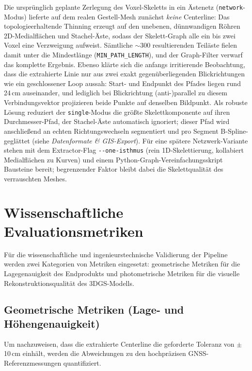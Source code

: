 \documentclass[12pt,a4paper]{article}
\begin{document}
\begin{enumerate}
          Die ursprünglich geplante Zerlegung des Voxel-Skeletts in ein Ästenetz (\texttt{network}-Modus) lieferte auf dem realen Gestell-Mesh zunächst \emph{keine} Centerline: Das topologieerhaltende Thinning erzeugt auf den unebenen, dünnwandigen Röhren 2D-Medialflächen und Stachel-Äste, sodass der Skelett-Graph alle ein bis zwei Voxel eine Verzweigung aufweist. Sämtliche $\sim$300 resultierenden Teiläste fielen damit unter die Mindestlänge (\texttt{MIN\_PATH\_LENGTH}), und der Graph-Filter verwarf das komplette Ergebnis. Ebenso klärte sich die anfangs irritierende Beobachtung, dass die extrahierte Linie nur aus zwei exakt gegenüberliegenden Blickrichtungen wie ein geschlossener Loop aussah: Start- und Endpunkt des Pfades liegen rund 24\,cm auseinander, und lediglich bei Blickrichtung (anti-)parallel zu diesem Verbindungsvektor projizieren beide Punkte auf denselben Bildpunkt. Als robuste Lösung reduziert der \texttt{single}-Modus die größte Skelettkomponente auf ihren Durchmesser-Pfad, der Stachel-Äste automatisch ignoriert; dieser Pfad wird anschließend an echten Richtungswechseln segmentiert und pro Segment B-Spline-geglättet (siehe \textit{Datenformate \& GIS-Export}). Für eine spätere Netzwerk-Variante stehen mit dem Extractor-Flag \texttt{-{}-one-isthmus} (rein 1D-Skelettierung, kollabiert Medialflächen zu Kurven) und einem Python-Graph-Vereinfachungsskript Bausteine bereit; begrenzender Faktor bleibt dabei die Skelettqualität des verrauschten Meshes.
\end{enumerate}

\section{Wissenschaftliche Evaluationsmetriken}
Für die wissenschaftliche und ingenieurstechnische Validierung der Pipeline werden zwei Kategorien von Metriken eingesetzt: geometrische Metriken für die Lagegenauigkeit des Endprodukts und photometrische Metriken für die visuelle Rekonstruktionsqualität des 3DGS-Modells.

\subsection{Geometrische Metriken (Lage- und Höhengenauigkeit)}
Um nachzuweisen, dass die extrahierte Centerline die geforderte Toleranz von $\pm$ 10\,cm einhält, werden die Abweichungen zu den hochpräzisen GNSS-Referenzmessungen quantifiziert.
\end{document}
